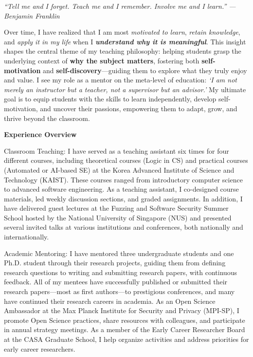 \documentclass{article}
\begin{document}
\thispagestyle{firstpage} %

\noindent \emph{``Tell me and I forget. Teach me and I remember. Involve me and I learn.'' \hfill--- Benjamin Franklin}

\vspace{.5em}
Over time, I have realized that I am most \emph{motivated to learn}, \emph{retain knowledge}, and \emph{apply it in my life} when I \textbf{\emph{understand why it is meaningful}}.
This insight shapes the central theme of my teaching philosophy: helping students grasp the underlying context of \textbf{why the subject matters}, fostering both \textbf{self-motivation} and \textbf{self-discovery}—guiding them to explore what they truly enjoy and value. I see my role as a mentor on the meta-level of education: \emph{`I am not merely an instructor but a teacher, not a supervisor but an advisor.'} My ultimate goal is to equip students with the skills to learn independently, develop self-motivation, and uncover their passions, empowering them to adapt, grow, and thrive beyond the classroom.

\vspace{.5em}\noindent\textbf{Experience Overview}\vspace{.5em}

\noindent Classroom Teaching: I have served as a teaching assistant six times for four different courses, including theoretical courses (Logic in CS) and practical courses (Automated or AI-based SE) at the Korea Advanced Institute of Science and Technology (KAIST). These courses ranged from introductory computer science to advanced software engineering. As a teaching assistant, I co-designed course materials, led weekly discussion sections, and graded assignments.
In addition, I have delivered guest lectures at the Fuzzing and Software Security Summer School hosted by the National University of Singapore (NUS) and presented several invited talks at various institutions and conferences, both nationally and internationally.

\vspace{0.5em}
\noindent Academic Mentoring: I have mentored three undergraduate students and one Ph.D. student through their research projects, guiding them from defining research questions to writing and submitting research papers, with continuous feedback. All of my mentees have successfully published or submitted their research papers—most as first authors—to prestigious conferences, and many have continued their research careers in academia. As an Open Science Ambassador at the Max Planck Institute for Security and Privacy (MPI-SP), I promote Open Science practices, share resources with colleagues, and participate in annual strategy meetings. As a member of the Early Career Researcher Board at the CASA Graduate School, I help organize activities and address priorities for early career researchers.
\end{document}
